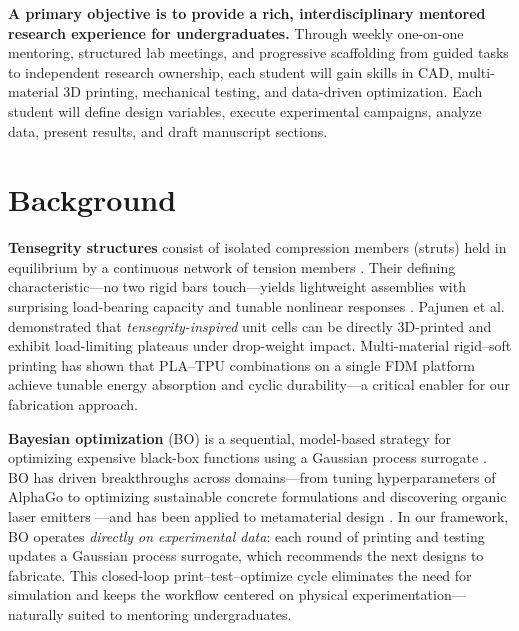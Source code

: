 \documentclass[11pt]{article}
\begin{document}
\textbf{A primary objective is to provide a rich,
interdisciplinary mentored research experience for undergraduates.}  Through
weekly one-on-one mentoring, structured lab meetings, and progressive
scaffolding from guided tasks to independent research
ownership, each student will gain skills in CAD, multi-material 3D
printing, mechanical testing, and data-driven optimization. Each student will define design variables, execute experimental campaigns, analyze data, present results, and draft manuscript sections.

\section{Background}

\textbf{Tensegrity structures} consist of isolated compression members (struts)
held in equilibrium by a continuous network of tension members
\citep{skelton2009tensegrity, sultan2009tensegrity}.  Their defining
characteristic---no two rigid bars touch---yields lightweight assemblies with
surprising load-bearing capacity and tunable nonlinear responses
\citep{amendola2014experimental, zhang2018tensegrity}.
Pajunen et al.\ \citep{pajunen2019design} demonstrated that
\emph{tensegrity-inspired} unit cells can be directly 3D-printed and exhibit
load-limiting plateaus under drop-weight impact.
Multi-material rigid--soft printing
\citep{khatri2024energy} has shown that PLA--TPU
combinations on a single FDM platform achieve tunable energy
absorption and cyclic durability---a critical enabler for our fabrication approach.

\textbf{Bayesian optimization} (BO) is a sequential, model-based strategy for
optimizing expensive black-box functions using a Gaussian process surrogate
\citep{shahriari2016taking, frazier2018tutorial}.  BO has driven breakthroughs
across domains---from tuning hyperparameters of AlphaGo
\citep{silver2016mastering} to optimizing sustainable concrete formulations
\citep{ament2023sustainable} and discovering organic laser
emitters \citep{striethkalthoff2024delocalized}---and has been applied to
metamaterial design \citep{mo2023accelerated}.  In our framework, BO operates
\emph{directly on experimental data}: each round of printing and testing
updates a Gaussian process surrogate, which recommends the next designs to fabricate.  This closed-loop
print--test--optimize cycle eliminates the need for simulation and
keeps the workflow centered on physical experimentation---naturally suited to mentoring undergraduates.
\end{document}
